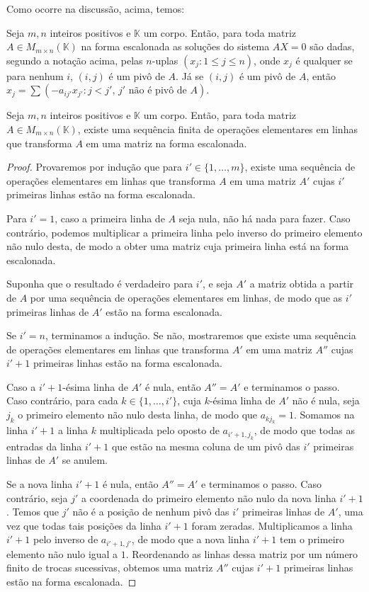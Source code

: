 Como ocorre na discussão, acima, temos:

\begin{theorem}
    Seja $m, n$ inteiros positivos e $\mathbb K$ um corpo.
    Então, para toda matriz $A\in M_{m \times n}(\mathbb K)$ na forma escalonada as soluções do sistema $AX=0$ são dadas, segundo a notação acima, pelas $n$-uplas
    $(x_j: 1\leq j\leq n)$, onde $x_j$ é qualquer se para nenhum $i$, $(i, j)$ é um pivô de $A$. Já se $(i, j)$ é um pivô de $A$, então $x_j=\sum\left(-a_{ij'}x_{j'}: j<j',\, j' \text{ não é pivô de } A\right)$.
\end{theorem}

\begin{theorem}
    Seja $m, n$ inteiros positivos e $\mathbb K$ um corpo.
    Então, para toda matriz $A\in M_{m \times n}(\mathbb K)$, existe uma sequência finita de operações elementares em linhas que transforma $A$ em uma matriz na forma escalonada.
\end{theorem}
\begin{proof}
    Provaremos por indução que para $i' \in \{1, \ldots, m\}$, existe uma sequência de operações elementares em linhas que transforma $A$ em uma matriz $A'$ cujas $i'$ primeiras linhas estão na forma escalonada.

    Para $i'=1$, caso a primeira linha de $A$ seja nula, não há nada para fazer.
    Caso contrário, podemos multiplicar a primeira linha pelo inverso do primeiro elemento não nulo desta, de modo a obter uma matriz cuja primeira linha está na forma escalonada.

    Suponha que o resultado é verdadeiro para $i'$, e seja $A'$ a matriz obtida a partir de $A$ por uma sequência de operações elementares em linhas, de modo que as $i'$ primeiras linhas de $A'$ estão na forma escalonada.

    Se $i'=n$, terminamos a indução. Se não, mostraremos que existe uma sequência de operações elementares em linhas que transforma $A'$ em uma matriz $A''$ cujas $i'+1$ primeiras linhas estão na forma escalonada.

    Caso a $i'+1$-ésima linha de $A'$ é nula, então $A''=A'$ e terminamos o passo.
    Caso contrário, para cada $k \in \{1, \ldots, i'\}$, cuja $k$-ésima linha de $A'$ não é nula, seja $j_k$ o primeiro elemento não nulo desta linha, de modo que $a_{kj_k}=1$.
    Somamos na linha $i'+1$ a linha $k$ multiplicada pelo oposto de $a_{i'+1, j_k}$, de modo que todas as entradas da linha $i'+1$ que estão na mesma coluna de um pivô das $i'$ primeiras linhas de $A'$ se anulem.

    Se a nova linha $i'+1$ é nula, então $A''=A'$ e terminamos o passo.
    Caso contrário, seja $j'$ a coordenada do primeiro elemento não nulo da nova linha $i'+1$.
    Temos que $j'$ não é a posição de nenhum pivô das $i'$ primeiras linhas de $A'$, uma vez que todas tais posições da linha $i'+1$ foram zeradas.
    Multiplicamos a linha $i'+1$ pelo inverso de $a_{i'+1, j'}$, de modo que a nova linha $i'+1$ tem o primeiro elemento não nulo igual a $1$.
    Reordenando as linhas dessa matriz por um número finito de trocas sucessivas, obtemos uma matriz $A''$ cujas $i'+1$ primeiras linhas estão na forma escalonada.
\end{proof}
